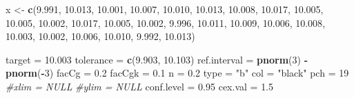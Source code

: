 \documentclass[
]{book}
\newenvironment{Shaded}{\begin{snugshade}}{\end{snugshade}}
\newcommand{\CommentTok}[1]{\textcolor[rgb]{0.56,0.35,0.01}{\textit{#1}}}
\newcommand{\DecValTok}[1]{\textcolor[rgb]{0.00,0.00,0.81}{#1}}
\newcommand{\FloatTok}[1]{\textcolor[rgb]{0.00,0.00,0.81}{#1}}
\newcommand{\FunctionTok}[1]{\textcolor[rgb]{0.13,0.29,0.53}{\textbf{#1}}}
\newcommand{\NormalTok}[1]{#1}
\newcommand{\OtherTok}[1]{\textcolor[rgb]{0.56,0.35,0.01}{#1}}
\newcommand{\SpecialCharTok}[1]{\textcolor[rgb]{0.81,0.36,0.00}{\textbf{#1}}}
\newcommand{\StringTok}[1]{\textcolor[rgb]{0.31,0.60,0.02}{#1}}
\begin{document}
\begin{Shaded}
\begin{Highlighting}[]
\NormalTok{x }\OtherTok{\textless{}{-}} \FunctionTok{c}\NormalTok{(}\FloatTok{9.991}\NormalTok{, }\FloatTok{10.013}\NormalTok{, }\FloatTok{10.001}\NormalTok{, }\FloatTok{10.007}\NormalTok{, }\FloatTok{10.010}\NormalTok{, }\FloatTok{10.013}\NormalTok{, }\FloatTok{10.008}\NormalTok{, }\FloatTok{10.017}\NormalTok{, }\FloatTok{10.005}\NormalTok{, }\FloatTok{10.005}\NormalTok{, }\FloatTok{10.002}\NormalTok{, }\FloatTok{10.017}\NormalTok{, }\FloatTok{10.005}\NormalTok{, }\FloatTok{10.002}\NormalTok{, }\FloatTok{9.996}\NormalTok{, }\FloatTok{10.011}\NormalTok{, }\FloatTok{10.009}\NormalTok{, }\FloatTok{10.006}\NormalTok{, }\FloatTok{10.008}\NormalTok{, }\FloatTok{10.003}\NormalTok{, }\FloatTok{10.002}\NormalTok{, }\FloatTok{10.006}\NormalTok{, }\FloatTok{10.010}\NormalTok{, }\FloatTok{9.992}\NormalTok{, }\FloatTok{10.013}\NormalTok{)}

\NormalTok{target }\OtherTok{=} \FloatTok{10.003}
\NormalTok{tolerance }\OtherTok{=} \FunctionTok{c}\NormalTok{(}\FloatTok{9.903}\NormalTok{, }\FloatTok{10.103}\NormalTok{)}
\NormalTok{ref.interval }\OtherTok{=} \FunctionTok{pnorm}\NormalTok{(}\DecValTok{3}\NormalTok{) }\SpecialCharTok{{-}} \FunctionTok{pnorm}\NormalTok{(}\SpecialCharTok{{-}}\DecValTok{3}\NormalTok{)}
\NormalTok{facCg }\OtherTok{=} \FloatTok{0.2}
\NormalTok{facCgk }\OtherTok{=} \FloatTok{0.1} 
\NormalTok{n }\OtherTok{=} \FloatTok{0.2}
\NormalTok{type }\OtherTok{=} \StringTok{"b"}
\NormalTok{col }\OtherTok{=} \StringTok{"black"}
\NormalTok{pch }\OtherTok{=} \DecValTok{19}
\CommentTok{\#xlim = NULL}
\CommentTok{\#ylim = NULL}
\NormalTok{conf.level }\OtherTok{=} \FloatTok{0.95}
\NormalTok{cex.val }\OtherTok{=} \FloatTok{1.5}
\end{Highlighting}
\end{Shaded}
\end{document}
